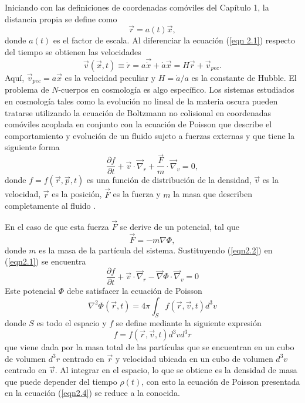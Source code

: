\documentclass[a4paper,openright,12pt]{book}
\begin{document}
Iniciando con las definiciones de coordenadas comóviles del Capítulo 1, la distancia propia se define como  
\begin{equation}
\vec{r} = a(t)\vec{x},\label{eqn 2.1}
\end{equation}
donde $a(t)$ es el factor de escala. Al diferenciar la ecuación (\ref{eqn 2.1}) respecto del tiempo se obtienen las velocidades
\begin{equation}
\vec{v}(\vec{x},t)\equiv\dot{r}=a\vec{\dot{x}}+\dot{a}\vec{x}
=H\vec{r}+\vec{v}_{pec}.\label{eqn 2.2}
\end{equation}
Aquí, $\vec{v}_{pec}=a\vec{x}$ es la velocidad peculiar y $H=\dot{a}/a$ es la constante de Hubble. El problema de $N$-cuerpos en cosmología es algo específico.  Los sistemas estudiados en cosmología tales como la evolución no lineal de la materia oscura pueden tratarse utilizando la ecuación de Boltzmann no colisional en coordenadas comóviles acoplada en conjunto con la ecuación de Poisson que describe el comportamiento y evolución de un fluido sujeto a fuerzas externas y que tiene la siguiente forma 
\begin{equation}
\frac{\partial f}{\partial t} + \vec{v}\cdot\vec\nabla_{r} + \frac{\vec{F}}{m}\cdot\vec\nabla_{v}=0,\label{eqn2.1}
\end{equation}
donde $f= f(\vec{r}, \vec{p}, t)$ es una función de distribución de la densidad, $\vec{v}$ es la velocidad, $\vec{r}$ es la posición, $\vec{F}$ es la fuerza y $m$ la masa que describen completamente al fluido \cite{b3}.

En el caso de que esta fuerza $\vec{F}$ se derive de un potencial, tal que 
\begin{equation}
\vec{F} = -m\nabla\Phi,\label{eqn2.2}
\end{equation}
donde $m$ es la masa de la partícula del sistema. Sustituyendo (\ref{eqn2.2}) en (\ref{eqn2.1}) se encuentra
\begin{equation}
\frac{\partial f}{\partial t} + \vec{v}\cdot\vec\nabla_{r} - \vec\nabla\Phi\cdot\vec\nabla_{v}=0\label{eqn2.3}
\end{equation} 
Este potencial $\Phi$ debe satisfacer la ecuación de Poisson
\begin{equation}
\nabla^{2} \Phi (\vec{r},t) = 4\pi \int_{S} f(\vec{r},\vec{v},t)d^{3}v\label{eqn2.4}
\end{equation}
donde $S$ es todo el espacio y $f$ se define mediante la siguiente expresión
\begin{equation}
f = f(\vec{r},\vec{v},t)d^{3}v d^{3}r\label{eqn 2.5}
\end{equation}
que viene dada por la masa total de las partículas que se encuentran en un cubo de volumen $d^{3}r$ centrado en $\vec{r}$ y velocidad ubicada en un cubo de volumen $d^{3}v$ centrado en $\vec{v}$. Al integrar en el espacio, lo que se obtiene es la densidad de masa que puede depender del tiempo $\rho(t)$, con esto la ecuación de Poisson presentada en la ecuación (\ref{eqn2.4}) se reduce a la conocida.
\end{document}
